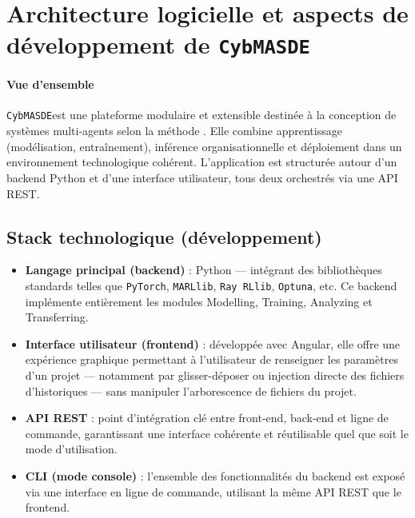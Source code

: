 \section*{Architecture logicielle et aspects de développement de \texttt{CybMASDE}}

\paragraph{Vue d’ensemble}
\texttt{CybMASDE}\footnotemark[1] est une plateforme modulaire et extensible destinée à la conception de systèmes multi-agents selon la méthode . Elle combine apprentissage (modélisation, entraînement), inférence organisationnelle et déploiement dans un environnement technologique cohérent. L'application est structurée autour d'un backend Python et d'une interface utilisateur, tous deux orchestrés via une API REST.



\subsection*{Stack technologique (développement)}

\begin{itemize}
  \item \textbf{Langage principal (backend)} : Python — intégrant des bibliothèques standards telles que \texttt{PyTorch}, \texttt{MARLlib}, \texttt{Ray RLlib}, \texttt{Optuna}, etc. Ce backend implémente entièrement les modules Modelling, Training, Analyzing et Transferring.
  \item \textbf{Interface utilisateur (frontend)} : développée avec Angular, elle offre une expérience graphique permettant à l’utilisateur de renseigner les paramètres d’un projet — notamment par glisser-déposer ou injection directe des fichiers d’historiques — sans manipuler l’arborescence de fichiers du projet.
  \item \textbf{API REST} : point d’intégration clé entre front-end, back-end et ligne de commande, garantissant une interface cohérente et réutilisable quel que soit le mode d’utilisation.
  \item \textbf{CLI (mode console)} : l’ensemble des fonctionnalités du backend est exposé via une interface en ligne de commande, utilisant la même API REST que le frontend.
\end{itemize}

